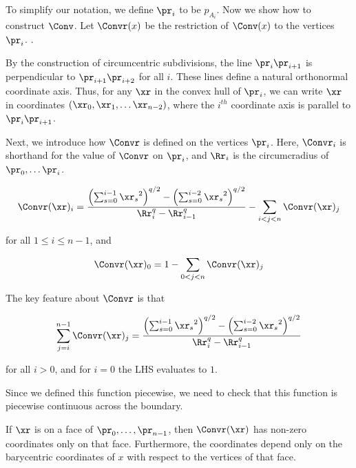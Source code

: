 To simplify our notation, we define $\pr_i$ to be $p_{A_i}$. Now we show
how to construct $\Conv$. Let $\Convr(x)$ be the restriction of $\Conv(x)$ to the
vertices $\pr_i$. .



By the construction of circumcentric subdivisions, 
the line $\pr_{i}\pr_{i+1}$ is perpendicular to
$\pr_{i+1}\pr_{i+2}$ for all $i$. These lines define a natural
orthonormal coordinate axis. Thus,
for any $\xr$ in the convex hull of $\pr_i$, we can write $\xr$ in
coordinates $(\xr_0, \xr_1, \ldots \xr_{n-2})$, where the $i^{th}$ coordinate
axis is parallel to $\pr_i \pr_{i+1}$.

Next, we introduce how $\Convr$ is defined on the vertices $\pr_{i}$. Here,
$\Convr_i$ is shorthand for the value of $\Convr$ on $\pr_{i}$, and $\Rr_i$
is the circumcradius of $\pr_0, \ldots \pr_{i}$.

\begin{align}
\Convr(\xr)_i = \frac{
\left(\sum_{s=0}^{i-1} {\xr_s}^2\right)^{q/2} -\left(\sum_{s=0}^{i-2}
{\xr_s}^2\right)^{q/2}
}
{
\Rr_{i}^q - \Rr_{i-1}^q
} - \sum_{i < j < n} \Convr(\xr)_j
\end{align}

for all $1 \leq i \leq n-1$, and 

\[ \Convr(\xr)_0 = 1 - \sum_{0 < j < n} \Convr(\xr)_j
\]

The key feature about $\Convr$ is that

\[\sum_{j=i}^{n-1} \Convr(\xr)_j= \frac{
\left(\sum_{s=0}^{i-1} {\xr_s}^2\right)^{q/2} -\left(\sum_{s=0}^{i-2}
{\xr_s}^2\right)^{q/2}
}
{
\Rr_{i}^q - \Rr_{i-1}^q
}\]

for all $i > 0$, and for $i = 0$ the LHS evaluates to $1$. 

Since we defined this function piecewise, we need to check that this
function is piecewise continuous across the boundary.

\begin{lemma}\label{lem:continuous}
If $\xr$ is on a face of $\pr_0, \ldots, \pr_{n-1}$, then
$\Convr(\xr)$ has non-zero coordinates only on that face. Furthermore, the
coordinates depend only on the barycentric coordinates of $x$ with respect
to the vertices of that face.
\end{lemma}

